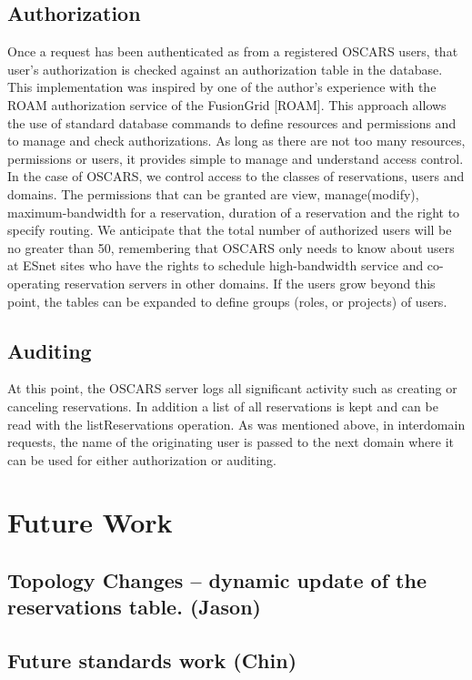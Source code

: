 \documentclass[conference]{IEEEtran}
\begin{document}
\subsection{Authorization}
Once a request has been authenticated as from a registered OSCARS
users, that user's authorization is checked against an authorization
table in the database. This implementation was inspired by one of the
author's experience with the ROAM authorization service of the
FusionGrid [ROAM]. This approach allows the use of standard database
commands to define resources and permissions and to manage and check
authorizations. As long as there are not too many resources,
permissions or users, it provides simple to manage and understand
access control. In the case of OSCARS, we control access to the
classes of reservations, users and domains. The permissions that can
be granted are view, manage(modify), maximum-bandwidth for a
reservation, duration of a reservation and the right to specify
routing.  We anticipate that the total number of authorized users will
be no greater than 50, remembering that OSCARS only needs to know
about users at ESnet sites who have the rights to schedule
high-bandwidth service and co-operating reservation servers in other
domains. If the users grow beyond this point, the tables can be
expanded to define groups (roles, or projects) of users.

\subsection{Auditing}
At this point, the OSCARS server logs all significant activity such as
creating or canceling reservations. In addition a list of all
reservations is kept and can be read with the listReservations
operation. As was mentioned above, in interdomain requests, the name
of the originating user is passed to the next domain where it can be
used for either authorization or auditing.


\section{Future Work}
\subsection{Topology Changes -- dynamic update of the reservations table. (Jason)}
\subsection{Future standards work (Chin)}
\end{document}

